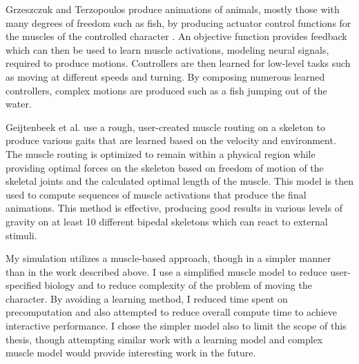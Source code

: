 Grzeszczuk and Terzopoulos produce animations of animals, mostly those with many degrees of freedom such as fish, by producing actuator control functions for the muscles of the controlled character \cite{fish_muscles}.  An objective function provides feedback which can then be used to learn muscle activations, modeling neural signals, required to produce motions.  Controllers are then learned for low-level tasks such as moving at different speeds and turning.  By composing numerous learned controllers, complex motions are produced such as a fish jumping out of the water.

Geijtenbeek et al.\cite{muscle_based_bipeds} use a rough, user-created muscle routing on a skeleton to produce various gaits that are learned based on the velocity and environment.  The muscle routing is optimized to remain within a physical region while providing optimal forces on the skeleton based on freedom of motion of the skeletal joints and the calculated optimal length of the muscle.  This model is then used to compute sequences of muscle activations that produce the final animations.  This method is effective, producing good results in various levels of gravity on at least 10 different bipedal skeletons which can react to external stimuli.

My simulation utilizes a muscle-based approach, though in a simpler manner than in the work described above.  I use a simplified muscle model to reduce user-specified biology and to reduce complexity of the problem of moving the character. By avoiding a learning method, I reduced time spent on precomputation and also attempted to reduce overall compute time to achieve interactive performance.  I chose the simpler model also to limit the scope of this thesis, though attempting similar work with a learning model and complex muscle model would provide interesting work in the future.

		



